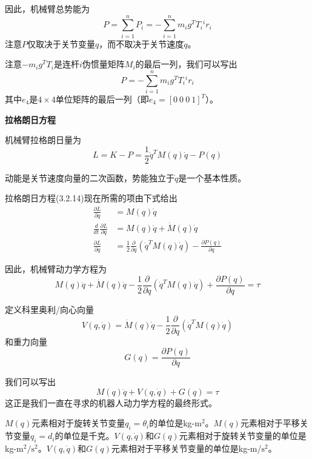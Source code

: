 \documentclass[12pt,a4paper]{ctexart}
\begin{document}
因此，机械臂总势能为
\begin{equation}
P = \sum_{i=1}^{n}P_i = -\sum_{i=1}^{n}m_i g^T T_i {^ir_i}
\end{equation}
注意$P$仅取决于关节变量$q$，而不取决于关节速度$\dot{q}$。

注意$-m_i g^T T_i$是连杆$i$伪惯量矩阵$M_i$的最后一列，我们可以写出
\begin{equation}
P = -\sum_{i=1}^{n}m_i g^T T_i {^ir_i}
\end{equation}
其中$e_4$是$4 \times 4$单位矩阵的最后一列（即$e_4 = [0 \ 0 \ 0 \ 1]^T$）。

\textbf{拉格朗日方程}

机械臂拉格朗日量为
\begin{equation}
L = K - P = \frac{1}{2}\dot{q}^T M(q)\dot{q} - P(q)
\end{equation}

动能是关节速度向量的二次函数，势能独立于$\dot{q}$是一个基本性质。

拉格朗日方程(3.2.14)现在所需的项由下式给出
\begin{align}
\frac{\partial L}{\partial \dot{q}} &= M(q)\dot{q} \\
\frac{d}{dt}\frac{\partial L}{\partial \dot{q}} &= M(q)\ddot{q} + \dot{M}(q)\dot{q} \\
\frac{\partial L}{\partial q} &= \frac{1}{2}\frac{\partial}{\partial q}(\dot{q}^T M(q)\dot{q}) - \frac{\partial P(q)}{\partial q}
\end{align}

因此，机械臂动力学方程为
\begin{equation}
M(q)\ddot{q} + \dot{M}(q)\dot{q} - \frac{1}{2}\frac{\partial}{\partial q}(\dot{q}^T M(q)\dot{q}) + \frac{\partial P(q)}{\partial q} = \tau
\end{equation}

定义科里奥利/向心向量
\begin{equation}
V(q,\dot{q}) = \dot{M}(q)\dot{q} - \frac{1}{2}\frac{\partial}{\partial q}(\dot{q}^T M(q)\dot{q})
\end{equation}
和重力向量
\begin{equation}
G(q) = \frac{\partial P(q)}{\partial q}
\end{equation}

我们可以写出
\begin{equation}
M(q)\ddot{q} + V(q,\dot{q}) + G(q) = \tau
\end{equation}
这正是我们一直在寻求的机器人动力学方程的最终形式。

$M(q)$元素相对于旋转关节变量$q_i = \theta_i$的单位是kg-$\text{m}^2$。$M(q)$元素相对于平移关节变量$q_i = d_i$的单位是千克。$V(q,\dot{q})$和$G(q)$元素相对于旋转关节变量的单位是kg-$\text{m}^2/\text{s}^2$。$V(q,\dot{q})$和$G(q)$元素相对于平移关节变量的单位是kg-m/$\text{s}^2$。
\end{document}
